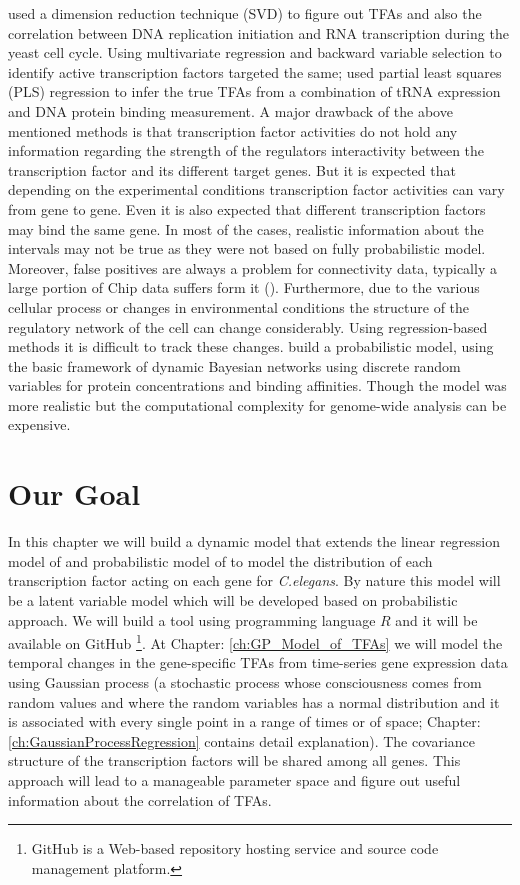 \cite{Alter:2004} used a dimension reduction technique (SVD) to figure out TFAs and also the correlation between DNA replication initiation and RNA transcription during the yeast cell cycle. 
Using multivariate regression and backward variable selection to identify active transcription factors \cite{Gao:2004} targeted the same; \cite{Boulesteix:2005} used partial least squares (PLS) regression to infer the true TFAs from a combination of tRNA expression and DNA protein binding measurement. A major drawback of the above mentioned methods is that transcription factor activities do not 
hold any information regarding the strength of the regulators interactivity between the transcription factor and its different target genes. But it is expected that depending on the experimental conditions transcription factor activities can vary from gene to gene. Even it is also expected that different transcription factors may bind the same gene. In most of the cases, realistic information about the intervals may not be true as they were not based on fully probabilistic model. Moreover, false positives are always a problem for connectivity data, typically a large portion of Chip data suffers form it 
(\cite{Boulesteix:2005}). Furthermore, due to the various cellular process or changes in environmental conditions the structure of the regulatory network of the cell can change considerably.
Using regression-based methods it is difficult to track these changes. \cite{Nachman:2004} build a probabilistic model, using the basic framework of dynamic Bayesian networks using discrete random variables for protein concentrations and binding affinities. Though the model was more realistic but the computational complexity for genome-wide analysis can be expensive.

\section{Our Goal}
In this chapter we will build a dynamic model that extends the linear regression model of \cite{Liao:2003} and probabilistic model of \cite{Sanguinetti:2006} to model the distribution of 
each transcription factor acting on each gene for \textit{C.elegans}. By nature this model will be a latent variable model which will be developed based on probabilistic approach. We will build a tool using programming language $R$ and it will be available on GitHub \footnote{GitHub is a Web-based repository hosting service and source code management platform.}. At Chapter: \ref{ch:GP_Model_of_TFAs} 
we will model the temporal changes in the gene-specific TFAs from time-series gene expression data using Gaussian process (a stochastic process whose consciousness comes from random values and where the random variables has a normal distribution and it is associated with every single point in a range of times or of space; Chapter: \ref{ch:GaussianProcessRegression} contains detail explanation). The covariance structure of the transcription factors will be shared among all genes. This approach will lead to a manageable parameter space and figure out useful information about the correlation of TFAs.

